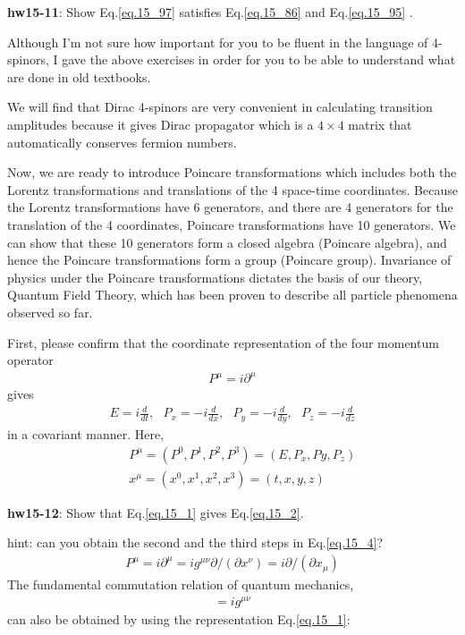 \documentclass[12pt]{article}
\def\del{{\partial}}
\begin{document}
{{\bf hw15-11}: Show Eq.\ref{eq.15_97} satisfies  Eq.\ref{eq.15_86}  and  Eq.\ref{eq.15_95} .

  Although I'm not sure how important for you to be fluent in the
  language of 4-spinors, I gave the above exercises in order for
  you to be able to understand what are done in old textbooks.

  We will find that Dirac 4-spinors are very convenient in calculating
  transition amplitudes because it gives Dirac propagator which is a
  $4\times 4$ matrix that automatically conserves fermion numbers.

  Now, we are ready to introduce Poincare transformations which includes
  both the Lorentz transformations and translations of the 4 space-time
  coordinates.  Because the Lorentz transformations have 6 generators,
  and there are 4 generators for the translation of the 4 coordinates,
  Poincare transformations have 10 generators.  We can show that these
  10 generators form a closed algebra (Poincare algebra), and hence the
  Poincare transformations form a group (Poincare group). Invariance
  of physics under the Poincare transformations dictates the basis of
  our theory, Quantum Field Theory, which has been proven to
  describe all particle phenomena observed so far.

  First, please confirm that the coordinate representation of the four
  momentum operator
\begin{eqnarray}
  P^\mu = i \del^\mu \label{eq.15_1}
\end{eqnarray}
  gives
\begin{eqnarray}
  E   =   i\frac{d}{dt}, ~~~
  P_x = - i \frac{d}{dx},~~~
  P_y = - i \frac{d}{dy},~~~
  P_z = - i \frac{d}{dz} \label{eq.15_2}
\end{eqnarray}
  in a covariant manner.  Here,
\begin{eqnarray}
  &&P^\mu = (P^0, P^1, P^2, P^3) = (E, P_x, Py, P_z) \label{eq.15_3a} \\
  &&x^\mu = (x^0, x^1, x^2, x^3) = (t,   x,   y,   z) \label{eq.15_3b}
\end{eqnarray}
 
{\bf hw15-12}: Show that Eq.\ref{eq.15_1} gives Eq.\ref{eq.15_2}.

hint: can you obtain the second and the third steps in Eq.\ref{eq.15_4}?
\begin{eqnarray}
  P^\mu = i \del^\mu
           = i g^{\mu\nu} \del/(\del x^\nu)
           = i \del/(\del x_\mu) \label{eq.15_4}
\end{eqnarray}
  The fundamental commutation relation of quantum mechanics,
\begin{eqnarray}
  [ P^\mu, x^\nu ] = i g^{\mu \nu} \label{eq.15_5}
\end{eqnarray}
  can also be obtained by using the representation Eq.\ref{eq.15_1}:

}
\end{document}
